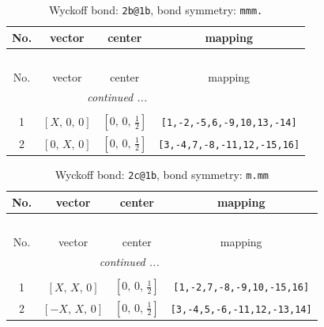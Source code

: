 \documentclass[fleqn,8pt]{jsarticle}
\begin{document}
\renewcommand{\arraystretch}{1.2}
\begin{longtable}{cccc}
\caption{Wyckoff bond: {\tt 2b@1b}, bond symmetry: {\tt mmm.}}
 \\
 \hline \hline
No. & vector & center & mapping \\ \hline \endfirsthead

\multicolumn{3}{l}{\tablename\ \thetable{}} \\
 \hline \hline
No. & vector & center & mapping \\ \hline \endhead

 \hline \hline
\multicolumn{3}{r}{\footnotesize\it continued ...} \\ \endfoot

 \hline \hline
\multicolumn{3}{r}{} \\ \endlastfoot

1 & $\left[ X,\, 0,\, 0 \right]$ & $\left[ 0,\, 0,\, \frac{1}{2} \right]$ & {\tt [1,-2,-5,6,-9,10,13,-14]} \\ \hline
2 & $\left[ 0,\, X,\, 0 \right]$ & $\left[ 0,\, 0,\, \frac{1}{2} \right]$ & {\tt [3,-4,7,-8,-11,12,-15,16]} \\
\end{longtable}
\renewcommand{\arraystretch}{1.2}
\begin{longtable}{cccc}
\caption{Wyckoff bond: {\tt 2c@1b}, bond symmetry: {\tt m.mm}}
 \\
 \hline \hline
No. & vector & center & mapping \\ \hline \endfirsthead

\multicolumn{3}{l}{\tablename\ \thetable{}} \\
 \hline \hline
No. & vector & center & mapping \\ \hline \endhead

 \hline \hline
\multicolumn{3}{r}{\footnotesize\it continued ...} \\ \endfoot

 \hline \hline
\multicolumn{3}{r}{} \\ \endlastfoot

1 & $\left[ X,\, X,\, 0 \right]$ & $\left[ 0,\, 0,\, \frac{1}{2} \right]$ & {\tt [1,-2,7,-8,-9,10,-15,16]} \\ \hline
2 & $\left[ - X,\, X,\, 0 \right]$ & $\left[ 0,\, 0,\, \frac{1}{2} \right]$ & {\tt [3,-4,5,-6,-11,12,-13,14]} \\
\end{longtable}
\renewcommand{\arraystretch}{1.2}
\end{document}
